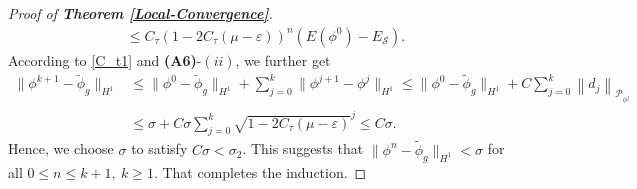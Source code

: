 \documentclass[preprint,3p]{elsarticle}
\begin{document}
\begin{proof}[Proof of {\bf Theorem \ref{Local-Convergence}}]
\begin{align*}
		&\le C_{\tau}\left(1-2C_{\tau}(\mu-\varepsilon)\right)^{n}(E(\phi^{0})-E_{\mathcal{S}}).
	\end{align*}
	According to \eqref{C_t1} and {\bf (A6)}-$(ii)$, we further get
\begin{align*}
		\|\phi^{k+1}-\widetilde{\phi}_g\|_{H^1}&\le\|\phi^{0}-\widetilde{\phi}_g\|_{H^1}+\sum\limits_{j=0}^{k}\|\phi^{j+1}-\phi^j\|_{H^1}\le\|\phi^{0}-\widetilde{\phi}_g\|_{H^1}+ C\sum\limits_{j=0}^{k}\left\|d_j\right\|_{\mathcal{P}_{\phi^j}}\\
		&\le \sigma+C\sigma\sum\limits_{j=0}^{k}\sqrt{1-2C_{\tau}(\mu-\varepsilon)}^{j}\le C\sigma.
	\end{align*}
	Hence, we choose $\sigma$ to satisfy $C\sigma<\sigma_2$. This suggests that $\|\phi^n-\widetilde{\phi}_g\|_{H^1}<\sigma$ for all $0\le n\le k+1,\ k\ge1$. That completes the induction. 
	

\end{proof}
\end{document}

